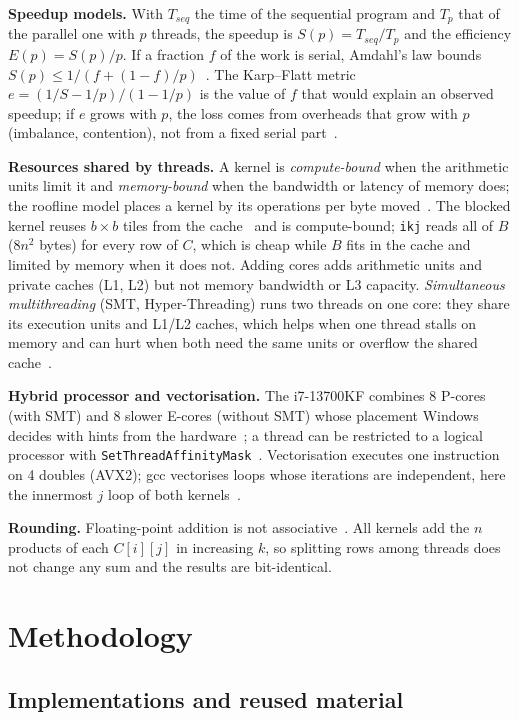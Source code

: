 \documentclass[11pt,a4paper]{article}
\begin{document}
\textbf{Speedup models.} With $T_{seq}$ the time of the sequential program and $T_p$ that of
the parallel one with $p$ threads, the speedup is $S(p) = T_{seq}/T_p$ and the efficiency
$E(p) = S(p)/p$. If a fraction $f$ of the work is serial, Amdahl's law bounds
$S(p) \le 1 / (f + (1-f)/p)$~\cite{amdahl1967}. The Karp--Flatt metric
$e = (1/S - 1/p) / (1 - 1/p)$ is the value of $f$ that would explain an observed speedup; if
$e$ grows with $p$, the loss comes from overheads that grow with $p$ (imbalance,
contention), not from a fixed serial part~\cite{karpflatt1990}.

\textbf{Resources shared by threads.} A kernel is \textit{compute-bound} when the arithmetic
units limit it and \textit{memory-bound} when the bandwidth or latency of memory does; the
roofline model places a kernel by its operations per byte moved~\cite{williams2009}. The
blocked kernel reuses $b \times b$ tiles from the cache~\cite{lam1991} and is
compute-bound; \texttt{ikj} reads all of $B$ ($8n^2$ bytes) for every row of $C$, which is
cheap while $B$ fits in the cache and limited by memory when it does not. Adding cores adds
arithmetic units and private caches (L1, L2) but not memory bandwidth or L3 capacity.
\textit{Simultaneous multithreading} (SMT, Hyper-Threading) runs two threads on one core:
they share its execution units and L1/L2 caches, which helps when one thread stalls on
memory and can hurt when both need the same units or overflow the shared
cache~\cite{tullsen1995, hennessy2019}.

\textbf{Hybrid processor and vectorisation.} The i7-13700KF combines 8 P-cores (with SMT)
and 8 slower E-cores (without SMT) whose placement Windows decides with hints from the
hardware~\cite{intelopt}; a thread can be restricted to a logical processor with
\texttt{SetThreadAffinityMask}~\cite{setaffinity}. Vectorisation executes one instruction
on 4 doubles (AVX2); gcc vectorises loops whose iterations are independent, here the
innermost $j$ loop of both kernels~\cite{gccopt}.

\textbf{Rounding.} Floating-point addition is not associative~\cite{goldberg1991}. All
kernels add the $n$ products of each $C[i][j]$ in increasing $k$, so splitting rows among
threads does not change any sum and the results are bit-identical.

\section{Methodology}

\subsection{Implementations and reused material}
\end{document}
